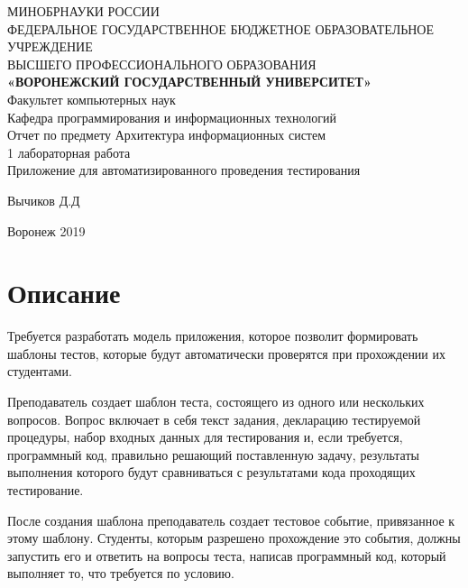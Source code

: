 \documentclass{article}
\begin{document}
\begin{center}
\hfill \break
\large{МИНОБРНАУКИ РОССИИ}\\
\footnotesize{ФЕДЕРАЛЬНОЕ ГОСУДАРСТВЕННОЕ БЮДЖЕТНОЕ ОБРАЗОВАТЕЛЬНОЕ УЧРЕЖДЕНИЕ}\\ 
\footnotesize{ВЫСШЕГО ПРОФЕССИОНАЛЬНОГО ОБРАЗОВАНИЯ}\\
\small{\textbf{«ВОРОНЕЖСКИЙ ГОСУДАРСТВЕННЫЙ УНИВЕРСИТЕТ»}}\\
\hfill \break
\normalsize{Факультет компьютерных наук}\\
    \hfill \break
\normalsize{Кафедра программирования и информационных технологий}\\
\hfill\break
\hfill \break
\hfill \break
\hfill \break
\large{Отчет по предмету Архитектура информационных систем
\\1 лабораторная работа
\\Приложение для автоматизированного проведения тестирования}\\
\end{center}

\hfill \break
\hfill \break
\hfill \break
\hfill \break
\hfill \break

\begin{flushright} Вычиков Д.Д \end{flushright}
\vspace*{\fill}
\begin{center} Воронеж 2019 \end{center}
\thispagestyle{empty}
\newpage


    \section{Описание}
    Требуется разработать модель приложения, которое позволит формировать шаблоны тестов,
    которые будут автоматически проверятся при прохождении их студентами.

    Преподаватель создает шаблон теста, состоящего из одного или нескольких вопросов.
    Вопрос включает в себя текст задания, декларацию тестируемой процедуры, набор входных
    данных для тестирования и, если требуется, программный код, правильно решающий
    поставленную задачу, результаты выполнения которого будут сравниваться с результатами
    кода проходящих тестирование.

    После создания шаблона преподаватель создает тестовое событие, привязанное к этому
    шаблону. Студенты, которым разрешено прохождение это события, должны запустить его
    и ответить на вопросы теста, написав программный код, который выполняет то, что
    требуется по условию.
\end{document}
